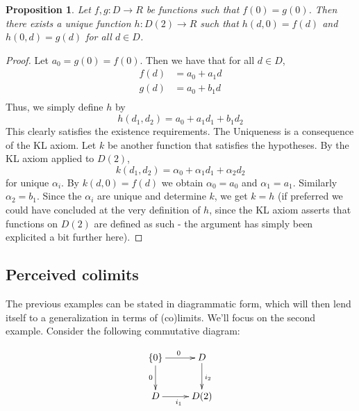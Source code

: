 \documentclass[11pt]{article}
\newtheorem{proposition}{Proposition}[section]
\theoremstyle{definition}
\numberwithin{equation}{section}
\begin{document}
\begin{proposition}
  Let \( f,g:D\to R \) be functions such that \( f(0)=g(0) \). Then there exists a unique function \( h:D(2)\to R \) such that \( h(d,0) = f(d) \) and \( h(0,d)=g(d) \) for all \( d\in D \).
  \label{prop:d2}
\end{proposition}

\begin{proof}
  Let \( a_0 = g(0)=f(0) \). Then we have that for all \( d\in D \),
  \begin{align*}
    f(d) &= a_0 + a_1d \\
    g(d) &= a_0 + b_1d \\
  \end{align*}
  Thus, we simply define \( h \) by
  \begin{equation*}
    h(d_1,d_2) = a_0 + a_1d_1 + b_1d_2
  \end{equation*}
  This clearly satisfies the existence requirements. The Uniqueness is a consequence of the KL axiom. Let \( k \) be another function that satisfies the hypotheses. By the KL axiom applied to \( D(2) \),
  \begin{equation*}
    k(d_1,d_2) = \alpha_0 + \alpha_1d_1 + \alpha_2d_2
  \end{equation*}
  for unique \( \alpha_i \). By \( k(d,0)=f(d) \) we obtain \( \alpha_0=a_0 \) and \( \alpha_1 = a_1 \). Similarly \( \alpha_2=b_1 \). Since the \( \alpha_i \) are unique and determine \( k \), we get \( k=h \) (if preferred we could have concluded at the very definition of \( h \), since the KL axiom asserts that functions on \( D(2) \) are defined as such - the argument has simply been explicited a bit further here).

\end{proof}

\subsection{Perceived colimits}

The previous examples can be stated in diagrammatic form, which will then lend itself to a generalization in terms of (co)limits. We'll focus on the second example. Consider the following commutative diagram:

\begin{equation}
  \xymatrix{
    {\{0\}} \ar[d]_0 \ar[r]^0   & D \ar[d]^{i_2} \\
    D \ar[r]_{i_1}              & D(2)
  }
  \label{dg:pushout}
\end{equation}
\end{document}
